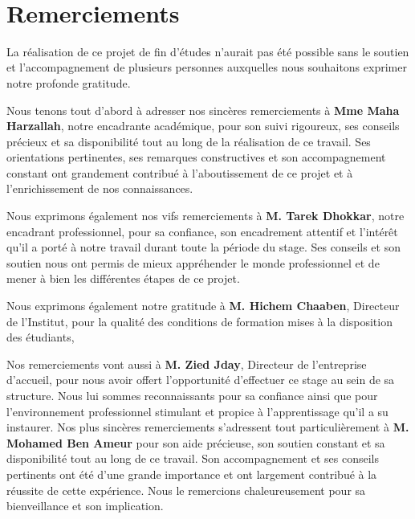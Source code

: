 ﻿﻿\chapter*{Remerciements}

La réalisation de ce projet de fin d'études n'aurait pas été possible sans le soutien et l'accompagnement de plusieurs personnes auxquelles nous souhaitons exprimer notre profonde gratitude.

\vspace{1em}

Nous tenons tout d'abord à adresser nos sincères remerciements à \textbf   {Mme Maha Harzallah}, notre encadrante académique, pour son suivi rigoureux, ses conseils précieux et sa disponibilité tout au long de la réalisation de ce travail. Ses orientations pertinentes, ses remarques constructives et son accompagnement constant ont grandement contribué à l'aboutissement de ce projet et à l'enrichissement de nos connaissances.

\vspace{1em}

Nous exprimons également nos vifs remerciements à \textbf{M. Tarek Dhokkar}, notre encadrant professionnel, pour sa confiance, son encadrement attentif et l'intérêt qu'il a porté à notre travail durant toute la période du stage. Ses conseils et son soutien nous ont permis de mieux appréhender le monde professionnel et de mener à bien les différentes étapes de ce projet.

\vspace{1em}

Nous exprimons également notre gratitude à \textbf{M. Hichem Chaaben}, Directeur de l'Institut, pour la qualité des conditions de formation mises à la disposition des étudiants, 
\vspace{1em}

Nos remerciements vont aussi à \textbf{M. Zied Jday}, Directeur de l'entreprise d'accueil, pour nous avoir offert l'opportunité d'effectuer ce stage au sein de sa structure. Nous lui sommes reconnaissants pour sa confiance ainsi que pour l'environnement professionnel stimulant et propice à l'apprentissage qu'il a su instaurer.
\vspace{1em}
Nos plus sincères remerciements s’adressent tout particulièrement à \textbf{M. Mohamed Ben Ameur} pour son aide précieuse, son soutien constant et sa disponibilité tout au long de ce travail. Son accompagnement et ses conseils pertinents ont été d’une grande importance et ont largement contribué à la réussite de cette expérience. Nous le remercions chaleureusement pour sa bienveillance et son implication.

